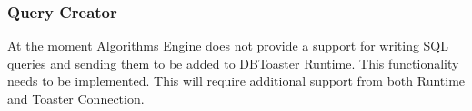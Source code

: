 \documentclass[14pt]{article}
\begin{document}

\subsubsection{Query Creator}

At the moment Algorithms Engine does not provide a support for writing SQL queries and sending them to be added to DBToaster Runtime. This functionality needs to be implemented. This will require additional support from both Runtime and Toaster Connection.

\end{document}
